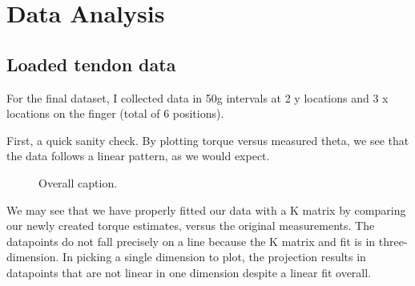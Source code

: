 \documentclass[preprint,12pt,3p]{elsarticle}
\begin{document}
\section{Data Analysis}

\subsection{Loaded tendon data}

For the final dataset, I collected data in 50g intervals at 2 y locations and 3 x locations on the
finger (total of 6 positions). 

First, a quick sanity check. By plotting torque versus measured theta, we see that the data follows
a linear pattern, as we would expect.


\begin{figure}[htbp]
    \centering 
        \hfil %
        \hfil
        \caption{ Overall caption.}
\end{figure}

We may see that we have properly fitted our data with a K matrix by comparing our
newly created torque estimates, versus the original measurements. The datapoints do not fall
precisely on a line because the K matrix and fit is in three-dimension. In picking a single
dimension to plot, the projection results in datapoints that are not linear in one dimension despite
a linear fit overall.
\end{document}
